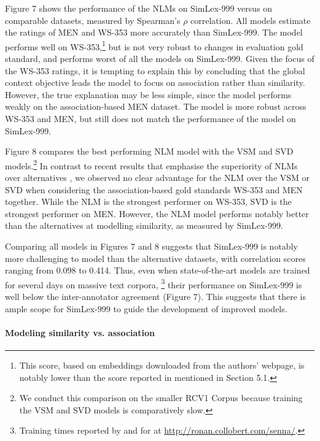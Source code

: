 \documentclass[fullname]{clv2}
\begin{document}
Figure 7 shows the performance of the NLMs on SimLex-999 versus on comparable datasets, measured by Spearman's \(\rho\) correlation. All models estimate the ratings of MEN and WS-353 more accurately than SimLex-999. The  model performs well on WS-353,\footnote{This score, based on embeddings downloaded from the authors' webpage, is notably lower than the score reported in \cite{huang2012improving} mentioned in Section 5.1.} but is not very robust to changes in evaluation gold standard, and performs worst of all the models on SimLex-999. Given the focus of the WS-353 ratings, it is tempting to explain this by concluding that the global context objective leads the  model to focus on association rather than similarity. However, the true explanation may be less simple, since the  model performs weakly on the association-based MEN dataset. The  model is more robust across WS-353 and MEN, but still does not match the performance of the  model on SimLex-999. 

Figure 8 compares the best performing NLM model \cite{mikolov2013efficient} with the VSM and SVD models.\footnote{We conduct this comparison on the smaller RCV1 Corpus \cite{lewis2004rcv1} because training the VSM and SVD models is comparatively slow.}  In contrast to recent results that emphasise the superiority of NLMs over alternatives \cite{baroni2014don}, we observed no clear advantage for the NLM over the VSM or SVD when considering the association-based gold standards WS-353 and MEN together. While the NLM is the strongest performer on WS-353, SVD is the strongest performer on MEN. However, the NLM model performs notably better than the alternatives at modelling similarity, as measured by SimLex-999. 

Comparing all models in Figures 7 and 8 suggests that SimLex-999 is notably more challenging to model than the alternative datasets, with correlation scores ranging from 0.098 to 0.414. Thus, even when state-of-the-art models are trained for several days on massive text corpora, \footnote{Training times reported by  and for  at \url{http://ronan.collobert.com/senna/}.} their performance on SimLex-999 is well below the inter-annotator agreement (Figure 7). This suggests that there is ample scope for SimLex-999 to guide the development of improved models. 

\paragraph{\bf Modeling similarity vs. association}
\end{document}
